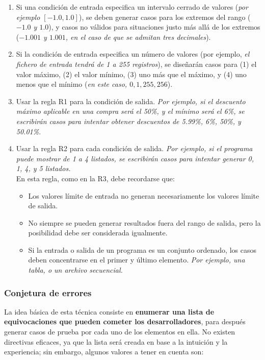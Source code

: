 \begin{enumerate}[R1.]
    \item Si una condición de entrada especifica un intervalo cerrado de valores (\textit{por ejemplo $[-1.0, 1.0]$}), se deben generar casos para los extremos del rango (\textit{$-1.0$ y $1.0$}), y casos no válidos para situaciones justo más allá de los extremos (\textit{$-1.001$ y $1.001$, en el caso de que se admitan tres decimales}).
    \item Si la condición de entrada especifica un número de valores (por ejemplo, \textit{el fichero de entrada tendrá de 1 a 255 registros}), se diseñarán casos para (1) el valor máximo, (2) el valor mínimo, (3) uno más que el máximo, y (4) uno menos que el mínimo (\textit{en este caso, $0, 1, 255, 256$}).
    \item Usar la regla R1 para la condición de salida. \textit{Por ejemplo, si el descuento máximo aplicable en una compra será el 50\%, y el mínimo será el 6\%, se escribirán casos para intentar obtener descuentos de 5.99\%, 6\%, 50\%, y 50.01\%}.
    \item Usar la regla R2 para cada condición de salida. \textit{Por ejemplo, si el programa puede mostrar de 1 a 4 listados, se escribirán casos para intentar generar 0, 1, 4, y 5 listados.}\\
    En esta regla, como en la R3, debe recordarse que:
    \begin{itemize}
        \item Los valores límite de entrada no generan necesariamente los valores límite de salida.
        \item No siempre se pueden generar resultados fuera del rango de salida, pero la posibilidad debe ser considerada igualmente.
        \item Si la entrada o salida de un programa es un conjunto ordenado, los casos deben concentrarse en el primer y último elemento. \textit{Por ejemplo, una tabla, o un archivo secuencial.}
    \end{itemize}
\end{enumerate}

\subsubsection{Conjetura de errores}

La idea básica de esta técnica consiste en \textbf{enumerar una lista de equivocaciones que pueden cometer los desarrolladores}, para después generar casos de prueba por cada uno de los elementos en ella. No existen directivas eficaces, ya que la lista será creada en base a la intuición y la experiencia; sin embargo, algunos valores a tener en cuenta son:

